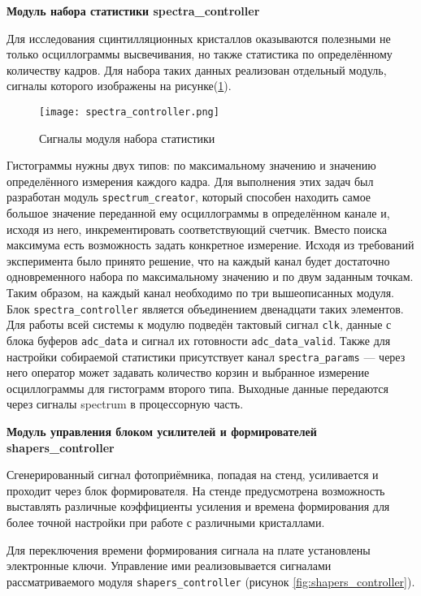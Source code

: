 \textbf{Модуль набора статистики spectra\_controller}\par
Для исследования сцинтилляционных кристаллов оказываются полезными не только осциллограммы высвечивания, но также статистика по определённому количеству кадров. Для набора таких данных реализован отдельный модуль, сигналы которого изображены на рисунке(\ref{fig:spectra_controller}).\par
\begin{figure}[ht]
    \centering
    \texttt{[image: spectra\_controller.png]}
    \caption{Сигналы модуля набора статистики}
    \label{fig:spectra_controller}
\end{figure}
Гистограммы нужны двух типов: по максимальному значению и значению определённого измерения каждого кадра. Для выполнения этих задач был разработан модуль \texttt{spectrum\_creator}, который способен находить самое большое значение переданной ему осциллограммы в определённом канале и, исходя из него, инкрементировать соответствующий счетчик. Вместо поиска максимума есть возможность задать конкретное измерение. Исходя из требований эксперимента было принято решение, что на каждый канал будет достаточно одновременного набора по максимальному значению и по двум заданным точкам. Таким образом, на каждый канал необходимо по три вышеописанных модуля. Блок \texttt{spectra\_controller} является объединением двенадцати таких элементов. Для работы всей системы к модулю подведён тактовый сигнал \texttt{clk}, данные с блока буферов \texttt{adc\_data} и сигнал их готовности \texttt{adc\_data\_valid}. Также для настройки собираемой статистики присутствует канал \texttt{spectra\_params} --- через него оператор может задавать количество корзин и выбранное измерение осциллограммы для гистограмм второго типа. Выходные данные передаются через сигналы spectrum в процессорную часть.\par
\textbf{Модуль управления блоком усилителей и формирователей shapers\_controller}\par
Сгенерированный сигнал фотоприёмника, попадая на стенд, усиливается и проходит через блок формирователя. На стенде предусмотрена возможность выставлять различные коэффициенты усиления и времена формирования для более точной настройки при работе с различными кристаллами.\par
Для переключения времени формирования сигнала на плате установлены электронные ключи. Управление ими реализовывается сигналами рассматриваемого модуля \texttt{shapers\_controller} (рисунок \ref{fig:shapers_controller}).\par
